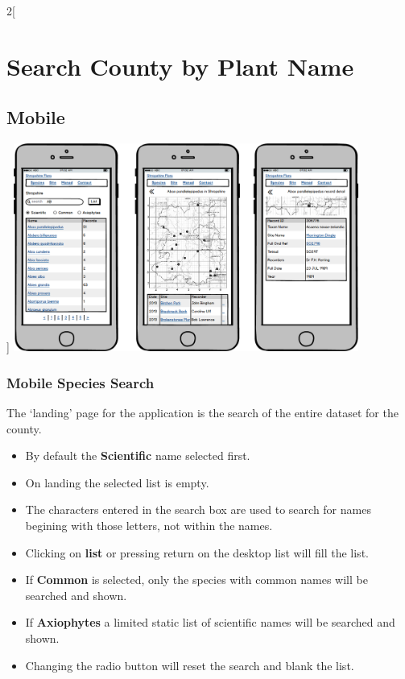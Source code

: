 \documentclass[a4paper,12pt,landscape]{article}
\begin{document}
\begin{multicols*}{2}[%
  \section{Search County by Plant Name}%
  \subsection{Mobile}%
]
\includegraphics[width=0.85\textwidth,height=\textheight,keepaspectratio]{./wireframes/county-mobile.png}%

\clearpage

\subsubsection{Mobile Species Search}
The `landing' page for the application is the search of the entire dataset for the county.

\begin{itemize}
  \item By default the \textbf{Scientific} name selected first.
  \item On landing the selected list is empty.
  \item The characters entered in the search box are used to search for names begining with those letters,
    not within the names.
  \item Clicking on \textbf{list} or pressing return on the desktop list will fill the list.
  \item If \textbf{Common} is selected, only the species with common names will be searched and shown.
  \item If \textbf{Axiophytes} a limited static list of scientific names will be searched and shown.
  \item Changing the radio button will reset the search and blank the list.
\end{itemize}


\end{multicols*}
\end{document}
